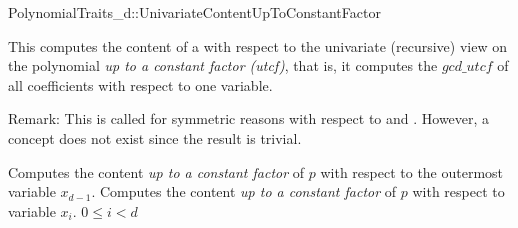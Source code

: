 \begin{ccRefConcept}{PolynomialTraits_d::UnivariateContentUpToConstantFactor}

\ccDefinition

This  computes the content of a 
with respect to the univariate (recursive) view on the 
polynomial {\em up to  a constant factor (utcf)}, that is, 
it computes the $gcd\_utcf$ of all coefficients  with respect to one variable. 

Remark: This is called  for 
symmetric reasons with respect to  
and . 
However, a concept  
does not exist since the result is trivial. 
 
\ccRefines 
{}

\ccTypes

\ccGlue
{}\ccGlue
{}

\ccOperations
{}
         {Computes the content {\em up to  a constant factor} of $p$ with 
          respect to the outermost variable $x_{d-1}$. }
         {Computes the content {\em up to  a constant factor} of $p$ with 
          respect to variable $x_i$. 
          \ccPrecond $0 \leq i  < d$
         }


\ccSeeAlso

\\
\\
\\

\end{ccRefConcept}
